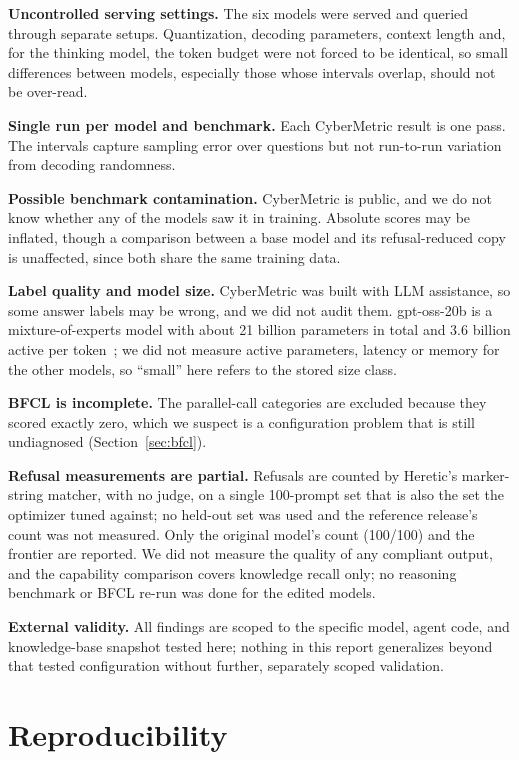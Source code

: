 \documentclass[conference]{IEEEtran}
\begin{document}
\textbf{Uncontrolled serving settings.} The six models were served and
queried through separate setups. Quantization, decoding parameters, context
length and, for the thinking model, the token budget were not forced to be
identical, so small differences between models, especially those whose
intervals overlap, should not be over-read.

\textbf{Single run per model and benchmark.} Each CyberMetric result is one
pass. The intervals capture sampling error over questions but not
run-to-run variation from decoding randomness.

\textbf{Possible benchmark contamination.} CyberMetric is public, and we do
not know whether any of the models saw it in training. Absolute scores may be
inflated, though a comparison between a base model and its refusal-reduced
copy is unaffected, since both share the same training data.

\textbf{Label quality and model size.} CyberMetric was built with LLM
assistance, so some answer labels may be wrong, and we did not audit them.
gpt-oss-20b is a mixture-of-experts model with about 21 billion parameters in
total and 3.6 billion active per token~\cite{gptoss}; we did not measure
active parameters, latency or memory for the other models, so ``small'' here
refers to the stored size class.

\textbf{BFCL is incomplete.} The parallel-call categories are excluded
because they scored exactly zero, which we suspect is a configuration
problem that is still undiagnosed (Section~\ref{sec:bfcl}).

\textbf{Refusal measurements are partial.} Refusals are counted by
Heretic's marker-string matcher, with no judge, on a single 100-prompt
set that is also the set the optimizer tuned against; no held-out set
was used and the reference release's count was not measured. Only the
original model's count (100/100) and the frontier are reported. We did
not measure the quality of any compliant output, and the capability
comparison covers knowledge recall only; no reasoning benchmark or BFCL
re-run was done for the edited models.

\textbf{External validity.} All findings are scoped to the specific model,
agent code, and knowledge-base snapshot tested here; nothing in this report
generalizes beyond that tested configuration without further, separately
scoped validation.

\section{Reproducibility}
\label{sec:repro}
\end{document}
